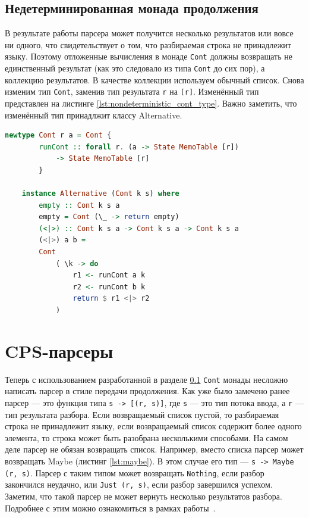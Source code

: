 \documentclass[times]{itmo-student-thesis}
\begin{document}
\subsection{Недетерминированная монада продолжения}\label{sec:contt_transformer}

В результате работы парсера может получится несколько результатов или вовсе ни одного, что свидетельствует о том, что 
разбираемая строка не принадлежит языку. Поэтому отложенные вычисления в монаде \lstinline{Cont} должны возвращать не 
единственный результат (как это следовало из типа \lstinline{Cont} до сих пор), а коллекцию результатов. В качестве коллекции используем обычный список.
Снова изменим тип \lstinline{Cont}, заменив тип результата \lstinline{r} на \lstinline{[r]}. Изменённый тип представлен на листинге \ref{lst:nondeterministic_cont_type}.
Важно заметить, что изменённый тип принадлжит классу Alternative.

\begin{lstlisting}[language=Haskell,float=!h,caption={Недетерминированная монада продолжения с состоянием},label={lst:nondeterministic_cont_type}]
    newtype Cont r a = Cont { 
        runCont :: forall r. (a -> State MemoTable [r]) 
            -> State MemoTable [r] 
        }

    instance Alternative (Cont k s) where
        empty :: Cont k s a
        empty = Cont (\_ -> return empty)
        (<|>) :: Cont k s a -> Cont k s a -> Cont k s a
        (<|>) a b =
        Cont
            ( \k -> do
                r1 <- runCont a k
                r2 <- runCont b k
                return $ r1 <|> r2
            )
\end{lstlisting}

\section{CPS-парсеры}\label{sec:cps_parser}

Теперь с использованием разработанной в разделе \ref{sec:contt_transformer} \lstinline{Cont} монады несложно написать парсер в стиле 
передачи продолжения. Как уже было замечено ранее парсер --- это функция типа \lstinline{s -> [(r, s)]}, где \lstinline{s} --- это
тип потока ввода, а \lstinline{r} --- тип результата разбора. Если возвращаемый список пустой, то разбираемая строка не принадлежит
языку, если возвращаемый список содержит более одного элемента, то строка может быть разобрана несколькими способами.
На самом деле парсер не обязан возвращать список. Например, вместо списка парсер может возвращать Maybe (листинг \ref{lst:maybe}).
В этом случае его тип --- \lstinline{s -> Maybe (r, s)}. Парсер с таким типом может возвращать \lstinline{Nothing}, если разбор 
закончился неудачно, или \lstinline{Just (r, s)}, если разбор завершился успехом. Заметим, что такой парсер не может вернуть 
несколько результатов разбора. Подробнее с этим можно ознакомиться в рамках работы~\cite{hutton_monadic_1999}.
\end{document}
